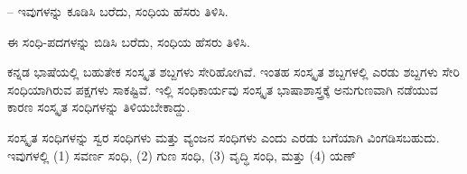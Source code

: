 \vspace{2.5pt plus 3pt minus 0.5pt}\noindent\hspace*{1.2em}\hspace{0.55em}-- ಇವುಗಳನ್ನು ಕೂಡಿಸಿ ಬರೆದು, ಸಂಧಿಯ ಹೆಸರು ತಿಳಿಸಿ.\par

\begin{kbvderiv}
\vspace{4pt plus 3pt minus 1pt}
\vspace{4pt plus 3pt minus 1pt}
\end{kbvderiv}

\vspace{2.5pt plus 3pt minus 0.5pt}\noindent\hspace*{1.2em}\hspace{0.55em}ಈ ಸಂಧಿ-ಪದಗಳನ್ನು ಬಿಡಿಸಿ ಬರೆದು, ಸಂಧಿಯ ಹೆಸರು ತಿಳಿಸಿ.\par

\begin{kbvderiv}
\vspace{4pt plus 3pt minus 1pt}
\vspace{4pt plus 3pt minus 1pt}
\end{kbvderiv}


\indent ಕನ್ನಡ ಭಾಷೆಯಲ್ಲಿ ಬಹುತೇಕ ಸಂಸ್ಕೃತ ಶಬ್ದಗಳು ಸೇರಿಹೋಗಿವೆ. ಇಂತಹ ಸಂಸ್ಕೃತ ಶಬ್ದಗಳಲ್ಲಿ ಎರಡು ಶಬ್ದಗಳು ಸೇರಿ ಸಂಧಿಯಾಗಿರುವ ಪಕ್ಷಗಳು ಸಾಕಷ್ಟಿವೆ. ಇಲ್ಲಿ ಸಂಧಿಕಾರ್ಯವು ಸಂಸ್ಕೃತ ಭಾಷಾಶಾಸ್ತ್ರಕ್ಕೆ ಅನುಗುಣವಾಗಿ ನಡೆಯುವ ಕಾರಣ ಸಂಸ್ಕೃತ ಸಂಧಿಗಳನ್ನು ತಿಳಿಯಬೇಕಾದ್ದು.\par

\indent ಸಂಸ್ಕೃತ ಸಂಧಿಗಳನ್ನು ಸ್ವರ ಸಂಧಿಗಳು ಮತ್ತು ವ್ಯಂಜನ ಸಂಧಿಗಳು ಎಂದು ಎರಡು ಬಗೆಯಾಗಿ ವಿಂಗಡಿಸಬಹುದು. ಇವುಗಳಲ್ಲಿ (1) ಸವರ್ಣ ಸಂಧಿ, (2) ಗುಣ ಸಂಧಿ, (3) ವೃದ್ಧಿ ಸಂಧಿ, ಮತ್ತು (4) ಯಣ್‌\kbvcontinues
